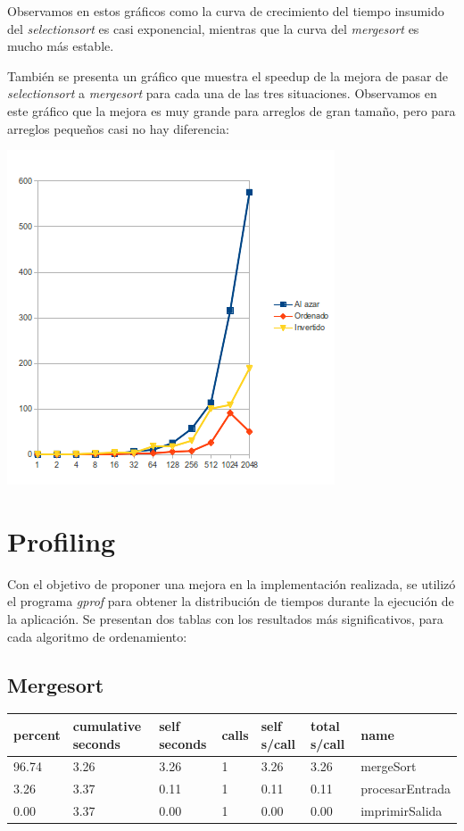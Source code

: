 \documentclass[a4paper,10pt]{article}
\begin{document}
Observamos en estos gr\'aficos como la curva de crecimiento del tiempo insumido del \textit{selectionsort} es casi exponencial, mientras que la curva del \textit{mergesort} es mucho m\'as estable.

Tambi\'en se presenta un gr\'afico que muestra el speedup de la mejora de pasar de \textit{selectionsort} a \textit{mergesort} para cada una de las tres situaciones. Observamos en este gr\'afico que la mejora es muy grande para arreglos de gran tama\~no, pero para arreglos peque\~nos casi no hay diferencia:
\begin{center}
\includegraphics[scale=0.50]{speedup-time.png}
\end{center}
\pagebreak

\section{Profiling} 
Con el objetivo de proponer una mejora en la implementaci\'on realizada, se utiliz\'o el programa \textit{gprof} para obtener la distribuci\'on de tiempos durante la ejecuci\'on de la aplicaci\'on. Se presentan dos tablas con los resultados m\'as significativos, para cada algoritmo de ordenamiento:

\subsection{Mergesort}

\begin{tabular}{|l|l|l|l|l|l|l|}
\hline
percent & cumulative seconds & self seconds & calls & self s/call & total s/call & name \\ \hline
 96.74   &   3.26  &   3.26   &     1  &   3.26  &   3.26  & mergeSort \\
  3.26   &   3.37  &   0.11   &     1  &   0.11  &   0.11  & procesarEntrada \\
  0.00   &   3.37  &   0.00   &     1  &   0.00  &   0.00  & imprimirSalida \\
\hline
\end{tabular}\\
\end{document}
